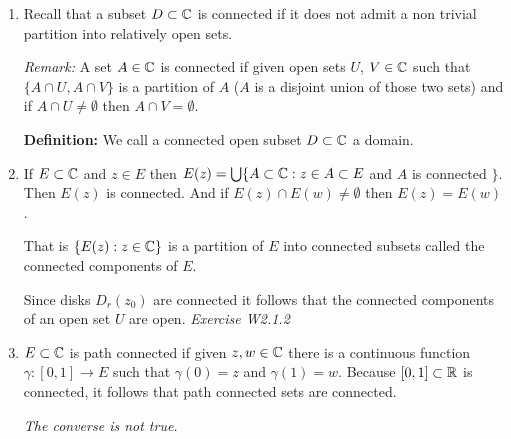 \documentclass[12pt]{article}
\begin{document}
\begin{enumerate}
    Let $R = \sup \{\, |z|: K$ converges at $z \}$. If $|z| < R$, then $\exists z$ such that $K$ converges at $z$, and $|z| < |z_1|$. But then $K$ converges absolutely at $z$. 
    
    
    If $|z| > R$ then we know $K$ diverges at $z$.
    
    Thus (a) and (b) hold with $R$. 

    If $0 < r < R$ then $K$ converges absolutely at $z= r$, and ww can let $M_n = |a_n|r^n$. Therefore $K$ converges uniformly on $D_r(0)$ and (c) holds. 

    Now let $R_0^{-1} = \lim_n \sup |a_n|^{1/n}$. If $0 < |z| < R_0$ then $\lim_n \sup |a_nz_n|^{1/n} = R_0^{-1}|z| < 1$. That is, $K$ converges absolutely at $z$. If $|z| > R_0$ then $\lim_n \sup |a_nz_n|^{1/n} = R_0^{-1}|z| > 1$. That is, $K$ diverges. Hence, $R = R_0$. 

    \item Recall that a subset $D \subset \mathbb C$ is connected if it does not admit a non trivial partition into relatively open sets. 
    
    \textit{Remark:} A set $A \in \mathbb C$ is connected if given open sets $U$, $V \in \mathbb C$ such that $\{A \cap U, A \cap V \}$ is a partition of $A$ ($A$ is a disjoint union of those two sets) and if $A \cap U \neq \emptyset$ then $A \cap V = \emptyset$. 
    
    \textbf{Definition:} We call a connected open subset $D \subset \mathbb C$ a domain. 

    \item If $E \subset \mathbb C$ and $z \in E$ then $E(z) = \bigcup \{A \subset \mathbb C : z \in A \subset E$ and $A$ is connected $\}$. Then $E(z)$ is connected. And if $E(z) \cap E(w) \neq \emptyset$ then $E(z) = E(w)$.
    
    That is $\{E(z) : z \in \mathbb C \}$ is a partition of $E$ into connected subsets called the connected components of $E$. 

    Since disks $D_r(z_0)$ are connected it follows that the connected components of an open set $U$ are open. \textit{Exercise W2.1.2}

    \item  $E \subset \mathbb C$ is path connected if given $z, w \in \mathbb C$ there is a continuous function $\gamma: [0,1] \to E$ such that $\gamma(0) = z$ and $\gamma(1) = w$. Because $[0,1] \subset \mathbb R$ is connected, it follows that path connected sets are connected. 
    
    \textit{The converse is not true.}
\end{enumerate}
\end{document}
